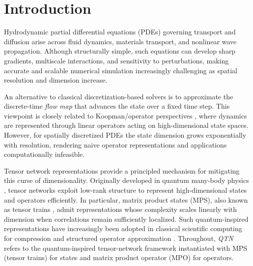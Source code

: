 \documentclass[letterpaper, 10 pt, conference]{ieeeconf}  %
\begin{document}
\section{Introduction}
\label{sec:introduction}

Hydrodynamic partial differential equations (PDEs) governing transport and diffusion
arise across fluid dynamics, materials transport, and nonlinear wave propagation.
Although structurally simple, such equations can develop sharp gradients,
multiscale interactions, and sensitivity to perturbations, making accurate and scalable
numerical simulation increasingly challenging as spatial resolution and dimension increase.

An alternative to classical discretization-based solvers is to approximate the discrete-time
\emph{flow map} that advances the state over a fixed time step. This viewpoint is closely related to
Koopman/operator perspectives
\cite{Koopman1931, Brunton2016}, where dynamics are represented through linear operators acting on
high-dimensional state spaces. However, for spatially discretized PDEs the state dimension grows
exponentially with resolution, rendering naive operator representations and applications computationally infeasible.

Tensor network representations provide a principled mechanism for mitigating this
curse of dimensionality. Originally developed in quantum many-body physics
\cite{Schollwock2011, Orus2014}, tensor networks exploit low-rank structure to represent
high-dimensional states and operators efficiently. In particular, matrix product
states (MPS), also known as tensor trains \cite{Orus2014, Oseledets2011}, admit representations
whose complexity scales linearly with dimension when correlations remain sufficiently
localized. Such quantum-inspired representations have increasingly been adopted in
classical scientific computing for compression and structured operator approximation
\cite{Cichocki2016,Peddinti2024CFD,Gourianov2022Turbulence,Kiffner2023ROM}. Throughout, \emph{QTN} refers to the quantum-inspired tensor-network framework instantiated with MPS (tensor trains) for states and 
matrix product operator (MPO) for operators.
\end{document}
